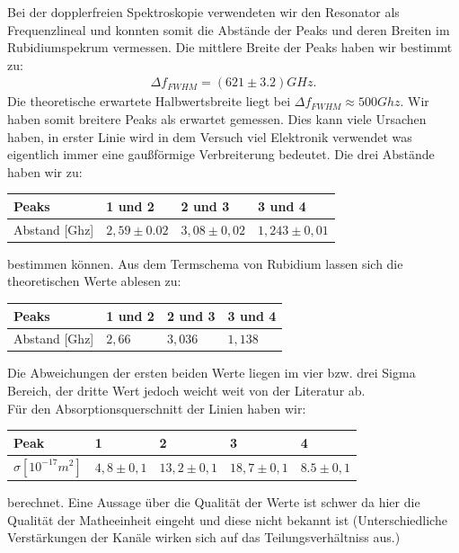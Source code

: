 \documentclass[12pt]{article}
\begin{document}
Bei der dopplerfreien Spektroskopie verwendeten wir den Resonator als Frequenzlineal und konnten somit die Abstände der Peaks und deren Breiten im Rubidiumspekrum vermessen.
Die mittlere Breite der Peaks haben wir bestimmt zu:
\begin{align*}
 \Delta f_{FWHM} = (621 \pm 3.2) GHz.
\end{align*}
Die theoretische erwartete Halbwertsbreite liegt bei $\Delta f_{FWHM} \approx 500 Ghz$. Wir haben somit breitere Peaks als erwartet gemessen. Dies kann viele Ursachen haben, in erster Linie wird in dem Versuch viel Elektronik verwendet was eigentlich immer eine gaußförmige Verbreiterung bedeutet.
Die drei Abstände haben wir zu:
\begin{table}[H]
\begin{center}
\begin{tabular}{|l|l|l|l|}
\hline
Peaks & 1 und 2 & 2 und 3 & 3 und 4\\
\hline
Abstand [Ghz] & $2,59 \pm 0.02$ & $3,08 \pm 0,02$ & $1,243 \pm 0,01$\\
\hline
\end{tabular}
\end{center}
\end{table}
bestimmen können.
Aus dem Termschema von Rubidium lassen sich die theoretischen Werte ablesen zu:
\begin{table}[H]
\begin{center}
\begin{tabular}{|l|l|l|l|}
\hline
Peaks & 1 und 2 & 2 und 3 & 3 und 4\\
\hline
Abstand [Ghz] & $2,66$ & $3,036$ & $1,138$\\
\hline
\end{tabular}
\end{center}
\end{table}
Die Abweichungen der ersten beiden Werte liegen im vier bzw. drei Sigma Bereich, der dritte Wert jedoch weicht weit von der Literatur ab.\\

Für den Absorptionsquerschnitt der Linien haben wir:
\begin{center}
\begin{tabular}{|l|l|l|l|l|}
\hline 
Peak & 1 & 2 & 3 & 4\\
\hline
$\sigma [10^{-17} m^2]$ & $4,8 \pm 0,1$ & $13,2 \pm 0,1$ & $18,7 \pm 0,1$ & $8.5 \pm 0,1$\\
\hline
\end{tabular}
\end{center}
berechnet. Eine Aussage über die Qualität der Werte ist schwer da hier die Qualität der Matheeinheit eingeht und diese nicht bekannt ist (Unterschiedliche Verstärkungen der Kanäle wirken sich auf das Teilungsverhältniss aus.)\\
\end{document}
